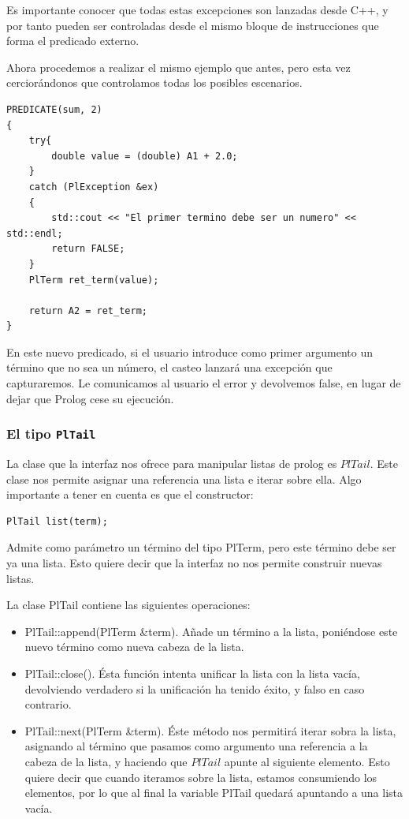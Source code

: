 \documentclass[a4paper]{article}
\begin{document}
Es importante conocer que todas estas excepciones son lanzadas desde C++, y por tanto pueden ser controladas desde el mismo bloque de instrucciones que forma el predicado externo.

Ahora procedemos a realizar el mismo ejemplo que antes, pero esta vez cerciorándonos que controlamos todas los posibles escenarios.

\begin{lstlisting}[style=C++]
PREDICATE(sum, 2)
{
	try{
		double value = (double) A1 + 2.0;
	}
	catch (PlException &ex)
	{
		std::cout << "El primer termino debe ser un numero" << std::endl;
		return FALSE;
	}
	PlTerm ret_term(value);
	
	return A2 = ret_term;
}
\end{lstlisting}

En este nuevo predicado, si el usuario introduce como primer argumento un término que no sea un número, el casteo lanzará una excepción que capturaremos. Le comunicamos al usuario el error y devolvemos false, en lugar de dejar que Prolog cese su ejecución.

\subsubsection{El tipo \texttt{PlTail}}

La clase que la interfaz nos ofrece para manipular listas de prolog es $PlTail$. Este clase nos permite asignar una referencia una lista e iterar sobre ella. Algo importante a tener en cuenta es que el constructor:

\begin{lstlisting}[style=C++]
PlTail list(term);
\end{lstlisting}

Admite como parámetro un término del tipo PlTerm, pero este término debe ser ya una lista. Esto quiere decir que la interfaz no nos permite construir nuevas listas.

La clase PlTail contiene las siguientes operaciones:

\begin{itemize}
\item PlTail::append(PlTerm \&term). Añade un término a la lista, poniéndose este nuevo término como nueva cabeza de la lista.
\item PlTail::close(). Ésta función intenta unificar la lista con la lista vacía, devolviendo verdadero si la unificación ha tenido éxito, y falso en caso contrario.
\item PlTail::next(PlTerm \&term). Éste método nos permitirá iterar sobra la lista, asignando al término que pasamos como argumento una referencia a la cabeza de la lista, y haciendo que $PlTail$ apunte al siguiente elemento. Esto quiere decir que cuando iteramos sobre la lista, estamos consumiendo los elementos, por lo que al final la variable PlTail quedará apuntando a una lista vacía.
\end{itemize}
\end{document}
